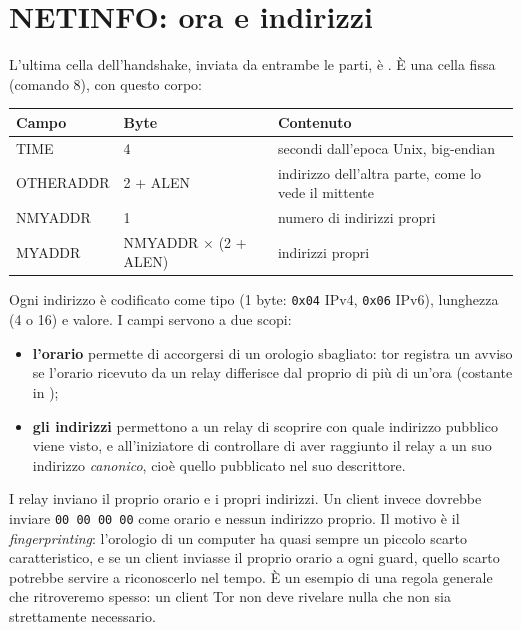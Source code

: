 \section{NETINFO: ora e indirizzi}\label{sec:canale-netinfo}

L'ultima cella dell'handshake, inviata da entrambe le parti, è . È una cella fissa (comando 8), con questo corpo:

\begin{center}
\begin{tabularx}{\textwidth}{@{}ll>{\raggedright\arraybackslash}X@{}}
\toprule
Campo & Byte & Contenuto \\
\midrule
TIME & 4 & secondi dall'epoca Unix, big-endian \\
OTHERADDR & 2 + ALEN & indirizzo dell'altra parte, come lo vede il mittente \\
NMYADDR & 1 & numero di indirizzi propri \\
MYADDR & NMYADDR $\times$ (2 + ALEN) & indirizzi propri \\
\bottomrule
\end{tabularx}
\end{center}

Ogni indirizzo è codificato come tipo (1 byte: \texttt{0x04} IPv4, \texttt{0x06} IPv6), lunghezza (4 o 16) e valore. I campi servono a due scopi:
\begin{itemize}
  \item \textbf{l'orario} permette di accorgersi di un orologio sbagliato: tor registra un avviso se l'orario ricevuto da un relay differisce dal proprio di più di un'ora (costante  in );
  \item \textbf{gli indirizzi} permettono a un relay di scoprire con quale indirizzo pubblico viene visto, e all'iniziatore di controllare di aver raggiunto il relay a un suo indirizzo \emph{canonico}, cioè quello pubblicato nel suo descrittore.
\end{itemize}

\begin{attenzione}
I relay inviano il proprio orario e i propri indirizzi. Un client invece dovrebbe inviare \texttt{00 00 00 00} come orario e nessun indirizzo proprio. Il motivo è il \emph{fingerprinting}: l'orologio di un computer ha quasi sempre un piccolo scarto caratteristico, e se un client inviasse il proprio orario a ogni guard, quello scarto potrebbe servire a riconoscerlo nel tempo. È un esempio di una regola generale che ritroveremo spesso: un client Tor non deve rivelare nulla che non sia strettamente necessario.
\end{attenzione}

